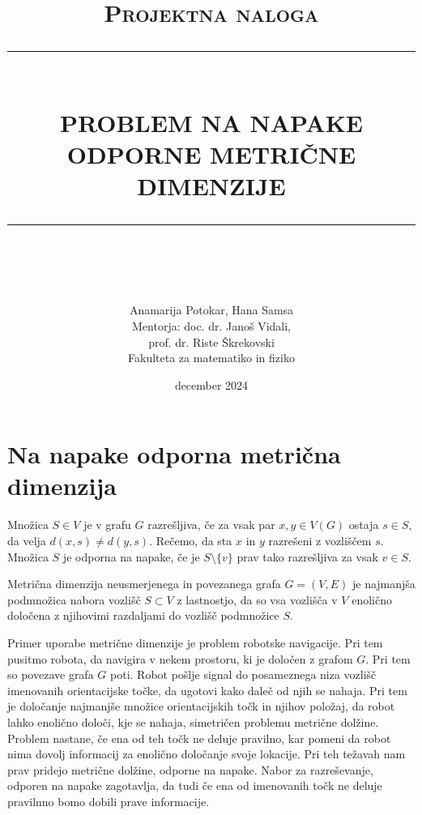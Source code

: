 \documentclass[12pt]{article}
\newcommand{\HRule}[1]{\rule{\linewidth}{#1}}
\begin{document}
\title{ \normalsize \textsc{Projektna naloga}
		\\ [2.0cm]
		\HRule{0.5pt} \\
		\LARGE \textbf{\uppercase{Problem na napake odporne metrične dimenzije}}
		\HRule{2pt} \\ [0.5cm]
		\normalsize \date{december 2024} \vspace*{5\baselineskip}}
\author{
		Anamarija Potokar, Hana Samsa 
        \vspace{1 cm} \\
		Mentorja: doc. dr. Janoš Vidali, \\
        prof. dr. Riste Škrekovski 
        \vspace{1 cm} \\
		Fakulteta za matematiko in fiziko }

\maketitle

\newpage

\section{Na napake odporna metrična dimenzija}
Množica $S \in V$ je v grafu $G$ razrešljiva, če za vsak par $x, y \in V(G)$ 
ostaja $s \in S,$ da velja $d(x, s) \neq d(y, s).$ Rečemo, da sta $x$ in $y$
razrešeni z vozliščem $s$. Množica $S$ je odporna na napake, če je 
$S \setminus \{v\}$ prav tako razrešljiva za vsak $v \in S.$ 

Metrična dimenzija neusmerjenega in povezanega grafa $G = (V, E)$ je najmanjša 
podmnožica nabora vozlišč $S \subset V$ z lastnostjo, da so vsa vozlišča v $V$ 
enolično določena z njihovimi razdaljami do vozlišč podmnožice $S$.

Primer uporabe metrične dimenzije je problem robotske navigacije. Pri tem pusitmo
robota, da navigira v nekem prostoru, ki je določen z grafom $G$. Pri tem so 
povezave grafa $G$ poti. Robot pošlje signal do posameznega niza vozlišč imenovanih 
orientacijske točke, da ugotovi kako daleč od njih se nahaja. Pri tem je določanje 
najmanjše množice orientacijskih točk in njihov položaj, da robot lahko enolično 
določi, kje se nahaja, simetričen problemu metrične dolžine. Problem nastane, 
če ena od teh točk ne deluje pravilno, kar pomeni da robot nima dovolj informacij 
za enolično določanje svoje lokacije. Pri teh težavah nam prav pridejo metrične 
dolžine, odporne na napake. 
Nabor za razreševanje, odporen na napake zagotavlja, da tudi če ena od imenovanih 
točk ne deluje pravilnno bomo dobili prave informacije.
\end{document}
